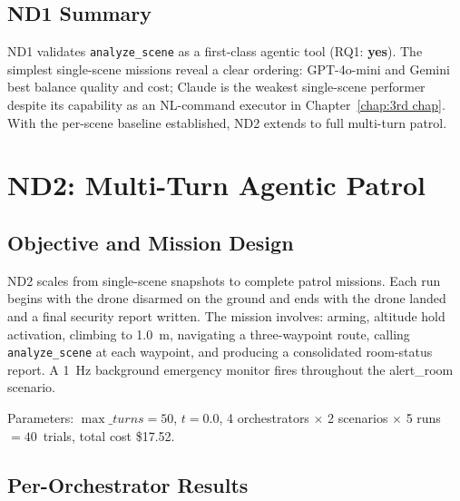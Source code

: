 \subsection{ND1 Summary}
\label{sec:ch4_nd1_summary}

ND1 validates \texttt{analyze\_scene} as a first-class agentic tool (RQ1: \textbf{yes}).
The simplest single-scene missions reveal a clear ordering: GPT-4o-mini and Gemini best
balance quality and cost; Claude is the weakest single-scene performer despite its
capability as an NL-command executor in Chapter~\ref{chap:3rd chap}.  With the per-scene
baseline established, ND2 extends to full multi-turn patrol.

\section{ND2: Multi-Turn Agentic Patrol}
\label{sec:ch4_nd2}

\subsection{Objective and Mission Design}
\label{sec:ch4_nd2_design}

ND2 scales from single-scene snapshots to complete patrol missions.  Each run begins with
the drone disarmed on the ground and ends with the drone landed and a final security report
written.  The mission involves: arming, altitude hold activation, climbing to 1.0~m,
navigating a three-waypoint route, calling \texttt{analyze\_scene} at each waypoint, and
producing a consolidated room-status report.  A 1~Hz background emergency monitor fires
throughout the alert\_room scenario.

Parameters: $\max\_turns = 50$, $t = 0.0$, 4 orchestrators $\times$ 2 scenarios $\times$
5 runs $= 40$~trials, total cost \$17.52.

\subsection{Per-Orchestrator Results}
\label{sec:ch4_nd2_results}

